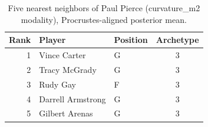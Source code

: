 \begin{table}[htbp]
  \centering\small
  \begin{tabular}{rllc}
    \toprule
    Rank & Player & Position & Archetype \\
    \midrule
    1 & Vince Carter & G & 3 \\
    2 & Tracy McGrady & G & 3 \\
    3 & Rudy Gay & F & 3 \\
    4 & Darrell Armstrong & G & 3 \\
    5 & Gilbert Arenas & G & 3 \\
    \bottomrule
  \end{tabular}
  \caption{Five nearest neighbors of Paul Pierce (curvature_m2 modality), Procrustes-aligned posterior mean.}
  \label{tab:Paul_Pierce_neighbors_curvature_m2}
\end{table}

